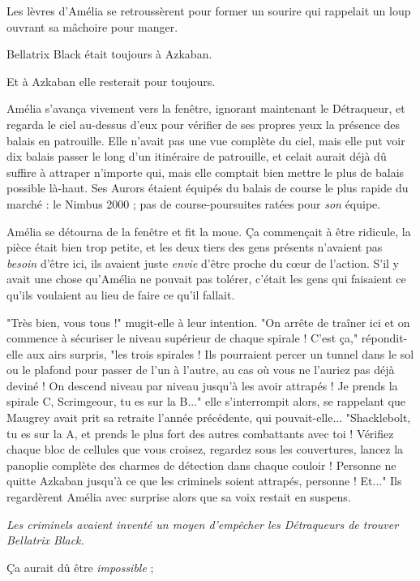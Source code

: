 Les lèvres d'Amélia se retroussèrent pour former un sourire qui rappelait un loup ouvrant sa mâchoire pour manger.

Bellatrix Black était toujours à Azkaban.

Et à Azkaban elle resterait pour toujours.

Amélia s'avança vivement vers la fenêtre, ignorant maintenant le Détraqueur, et regarda le ciel au-dessus d'eux pour vérifier de ses propres yeux la présence des balais en patrouille. Elle n'avait pas une vue complète du ciel, mais elle put voir dix balais passer le long d'un itinéraire de patrouille, et celait aurait déjà dû suffire à attraper n'importe qui, mais elle comptait bien mettre le plus de balais possible là-haut. Ses Aurors étaient équipés du balais de course le plus rapide du marché : le Nimbus 2000 ; pas de course-poursuites ratées pour \emph{son}  équipe.

Amélia se détourna de la fenêtre et fit la moue. Ça commençait à être ridicule, la pièce était bien trop petite, et les deux tiers des gens présents n'avaient pas \emph{besoin}  d'être ici, ils avaient juste \emph{envie}  d'être proche du cœur de l'action. S'il y avait une chose qu'Amélia ne pouvait pas tolérer, c'était les gens qui faisaient ce qu'ils voulaient au lieu de faire ce qu'il fallait.

"Très bien, vous tous !" mugit-elle à leur intention. "On arrête de traîner ici et on commence à sécuriser le niveau supérieur de chaque spirale ! C'est ça," répondit-elle aux airs surpris, "les trois spirales ! Ils pourraient percer un tunnel dans le sol ou le plafond pour passer de l'un à l'autre, au cas où vous ne l'auriez pas déjà deviné ! On descend niveau par niveau jusqu'à les avoir attrapés ! Je prends la spirale C, Scrimgeour, tu es sur la B..." elle s'interrompit alors, se rappelant que Maugrey avait prit sa retraite l'année précédente, qui pouvait-elle... "Shacklebolt, tu es sur la A, et prends le plus fort des autres combattants avec toi ! Vérifiez chaque bloc de cellules que vous croisez, regardez sous les couvertures, lancez la panoplie complète des charmes de détection dans chaque couloir ! Personne ne quitte Azkaban jusqu'à ce que les criminels soient attrapés, personne ! Et..." Ils regardèrent Amélia avec surprise alors que sa voix restait en suspens.

\emph{Les criminels avaient inventé un moyen d'empêcher les Détraqueurs de trouver Bellatrix Black.} 

Ça aurait dû être \emph{impossible} ;

